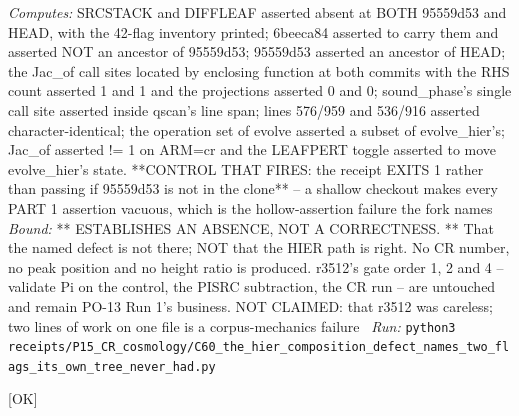 \begin{description}
\emph{Computes:} SRCSTACK and DIFFLEAF asserted absent at BOTH 95559d53 and HEAD, with the 42-flag inventory printed; 6beeca84 asserted to carry them and asserted NOT an ancestor of 95559d53; 95559d53 asserted an ancestor of HEAD; the Jac\_of call sites located by enclosing function at both commits with the RHS count asserted 1 and 1 and the projections asserted 0 and 0; sound\_phase's single call site asserted inside qscan's line span; lines 576/959 and 536/916 asserted character-identical; the operation set of evolve asserted a subset of evolve\_hier's; Jac\_of asserted != 1 on ARM=cr and the LEAFPERT toggle asserted to move evolve\_hier's state. **CONTROL THAT FIRES: the receipt EXITS 1 rather than passing if 95559d53 is not in the clone** -- a shallow checkout makes every PART 1 assertion vacuous, which is the hollow-assertion failure the fork names
 \emph{Bound:} ** ESTABLISHES AN ABSENCE, NOT A CORRECTNESS. ** That the named defect is not there; NOT that the HIER path is right. No CR number, no peak position and no height ratio is produced. r3512's gate order 1, 2 and 4 -- validate Pi on the control, the PISRC subtraction, the CR run -- are untouched and remain PO-13 Run 1's business. NOT CLAIMED: that r3512 was careless; two lines of work on one file is a corpus-mechanics failure
\ \emph{Run:} \texttt{python3 receipts/P15\_CR\_cosmology/C60\_the\_hier\_composition\_defect\_names\_two\_flags\_its\_own\_tree\_never\_had.py}
\item[\label{rcpt:C62_the_diffusion_signature_is_a_wash_and_the_isw_is_not_what_it_turned_on}\texttt{C62\_the\_diffusion\_signature\_is\_a\_wash\_and\_the\_isw\_is\_not\_what\_it\_turned\_on}]\hfill\textsf{[OK]}\\

\end{description}

